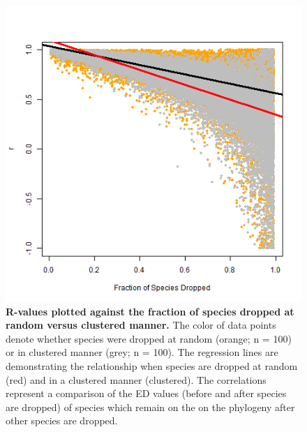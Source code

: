 \documentclass[12pt,english]{article}
\begin{document}
\begin{figure}[!ht]
  \center
  \includegraphics[width=.5\textwidth]{randomVsCluster.png}
  \caption{\textbf{R-values plotted against the fraction of species dropped at
  random versus clustered manner.} The color of data points denote whether
  species were dropped at random (orange; n = 100) or in clustered manner
  (grey; n = 100). The regression lines are demonstrating the relationship when
  species are dropped at random (red) and in a clustered manner (clustered). The
  correlations represent a comparison of the ED values (before and after
  species are dropped) of species which remain on the on the phylogeny after
  other species are dropped. 
  }
  \label{randomVsClustered}
\end{figure}
\end{document}
